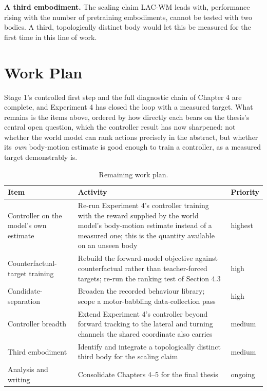 \documentclass[12pt,a4paper,oneside]{report}
\begin{document}
\noindent\textbf{A third embodiment.} The scaling claim LAC-WM leads with, performance rising with the number of
pretraining embodiments, cannot be tested with two bodies. A third, topologically distinct body would let this
be measured for the first time in this line of work.

\section{Work Plan}
Stage 1's controlled first step and the full diagnostic chain of Chapter 4 are complete, and Experiment 4 has
closed the loop with a measured target. What remains is the items above, ordered by how directly each bears on the
thesis's central open question, which the controller result has now sharpened: not whether the world model can rank
actions precisely in the abstract, but whether its \emph{own} body-motion estimate is good enough to train a
controller, as a measured target demonstrably is.

\begin{table}[H]
\centering
\small
\caption{Remaining work plan.}
\label{tab:plan}
\begin{tabularx}{\textwidth}{>{\hsize}Y>{\hsize}Y>{\hsize\centering\arraybackslash}Y}
\hline
\textbf{Item} & \textbf{Activity} & \textbf{Priority}\\
\hline
Controller on the model's own estimate & Re-run Experiment 4's controller training with the reward supplied by the
  world model's body-motion estimate instead of a measured one; this is the quantity available on an unseen body &
  highest\\
Counterfactual-target training & Rebuild the forward-model objective against counterfactual rather than
  teacher-forced targets; re-run the ranking test of Section 4.3 & high\\
Candidate-separation & Broaden the recorded behaviour library; scope a motor-babbling data-collection pass &
  high\\
Controller breadth & Extend Experiment 4's controller beyond forward tracking to the lateral and turning channels
  the shared coordinate also carries & medium\\
Third embodiment & Identify and integrate a topologically distinct third body for the scaling claim & medium\\
Analysis and writing & Consolidate Chapters 4--5 for the final thesis & ongoing\\
\hline
\end{tabularx}
\end{table}
\end{document}

